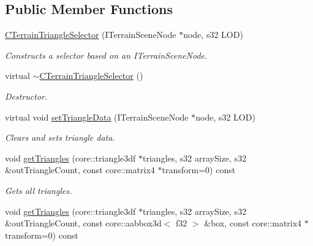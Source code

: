 \subsection*{Public Member Functions}
\begin{DoxyCompactItemize}
\item 
\hyperlink{classirr_1_1scene_1_1_c_terrain_triangle_selector_ad07fd12ae7c3e84fb6339fdb249b79bb}{C\-Terrain\-Triangle\-Selector} (I\-Terrain\-Scene\-Node $\ast$node, s32 L\-O\-D)
\begin{DoxyCompactList}\small\item\em Constructs a selector based on an I\-Terrain\-Scene\-Node. \end{DoxyCompactList}\item 
virtual \hyperlink{classirr_1_1scene_1_1_c_terrain_triangle_selector_a3ef7d64d03c87d6ed83e6d03148c408c}{$\sim$\-C\-Terrain\-Triangle\-Selector} ()
\begin{DoxyCompactList}\small\item\em Destructor. \end{DoxyCompactList}\item 
\hypertarget{classirr_1_1scene_1_1_c_terrain_triangle_selector_af1b952f557023752305e9479571f063f}{virtual void \hyperlink{classirr_1_1scene_1_1_c_terrain_triangle_selector_af1b952f557023752305e9479571f063f}{set\-Triangle\-Data} (I\-Terrain\-Scene\-Node $\ast$node, s32 L\-O\-D)}\label{classirr_1_1scene_1_1_c_terrain_triangle_selector_af1b952f557023752305e9479571f063f}

\begin{DoxyCompactList}\small\item\em Clears and sets triangle data. \end{DoxyCompactList}\item 
\hypertarget{classirr_1_1scene_1_1_c_terrain_triangle_selector_a862b739a637e89a7c1f2ed8e23567fad}{void \hyperlink{classirr_1_1scene_1_1_c_terrain_triangle_selector_a862b739a637e89a7c1f2ed8e23567fad}{get\-Triangles} (core\-::triangle3df $\ast$triangles, s32 array\-Size, s32 \&out\-Triangle\-Count, const core\-::matrix4 $\ast$transform=0) const }\label{classirr_1_1scene_1_1_c_terrain_triangle_selector_a862b739a637e89a7c1f2ed8e23567fad}

\begin{DoxyCompactList}\small\item\em Gets all triangles. \end{DoxyCompactList}\item 
\hypertarget{classirr_1_1scene_1_1_c_terrain_triangle_selector_a9ecdf641aa2365207c298376cada073e}{void \hyperlink{classirr_1_1scene_1_1_c_terrain_triangle_selector_a9ecdf641aa2365207c298376cada073e}{get\-Triangles} (core\-::triangle3df $\ast$triangles, s32 array\-Size, s32 \&out\-Triangle\-Count, const core\-::aabbox3d$<$ f32 $>$ \&box, const core\-::matrix4 $\ast$transform=0) const }\label{classirr_1_1scene_1_1_c_terrain_triangle_selector_a9ecdf641aa2365207c298376cada073e}


\end{DoxyCompactItemize}
